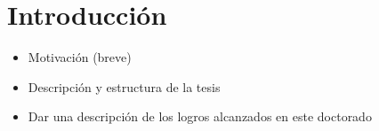 \chapter{Introducci\'on}

\begin{itemize}
	\item Motivaci\'on (breve)
	\item Descripci\'on y estructura de la tesis
	\item Dar una descripci\'on de los logros alcanzados en este doctorado
\end{itemize}